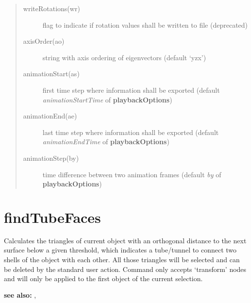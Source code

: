 \documentclass[letterpaper,10pt,english]{sphinxmanual}
\begin{document}
\begin{description}
\begin{quote}
\begin{description}
\item[{writeRotations(wr)}] \leavevmode
flag to indicate if rotation values shall be written to file (deprecated)

\item[{axisOrder(ao)}] \leavevmode
string with axis ordering of eigenvectors (default `yzx')

\item[{animationStart(as)}] \leavevmode
first time step where information shall be exported (default \emph{animationStartTime} of \textbf{playbackOptions})

\item[{animationEnd(ae)}] \leavevmode
last time step where information shall be exported (default \emph{animationEndTime} of \textbf{playbackOptions})

\item[{animationStep(by)}] \leavevmode
time difference between two animation frames (default \emph{by} of \textbf{playbackOptions})

\end{description}\end{quote}

\end{description}


\section{findTubeFaces}
\label{pk_src.findTubeFaces::doc}\label{pk_src.findTubeFaces:findtubefaces}\label{pk_src.findTubeFaces:id1}
{\hyperref[index:commands]{}}
\label{pk_src.findTubeFaces:module-pk_src.findTubeFaces}
Calculates the triangles of current object with an orthogonal distance to the next surface below a given threshold, which indicates a tube/tunnel to connect two shells of the object with each other. All those triangles will be selected and can be deleted by the standard user action.
Command only accepts `transform' nodes and will only be applied to the first object of the current selection.

\textbf{see also:} {\hyperref[pk_src.cleanup:cleanup]{}}, {\hyperref[pk_src.getShells:getshells]{}}
\end{document}

